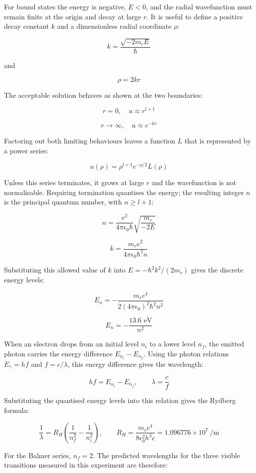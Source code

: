 \documentclass[12pt,a4paper]{article}
\begin{document}
For bound states the energy is negative, $E<0$, and the radial
wavefunction must remain finite at the origin and decay at large
$r$. It is useful to define a positive decay constant $k$ and
a dimensionless radial coordinate $\rho$:

\[
    k = \frac{\sqrt{-2m_r E}}{\hbar}
\]

and

\[
    \rho = 2 k r
\]

The acceptable solution behaves as shown at the two boundaries:

\[
    r = 0,\quad u \approx r^{l+1}
\]

\[
    r \to \infty, \quad u \approx e^{-k r}
\]

Factoring out both limiting behaviours leaves a function $L$
that is represented by a power series:

\[
    u(\rho) = \rho^{l+1} e^{-\rho/2} L(\rho)
\]

Unless this series terminates, it grows at large $r$ and the
wavefunction is not normalisable. Requiring termination
quantises the energy; the resulting integer $n$ is the principal
quantum number, with $n\geq l+1$:

\[
    n = \frac{e^2}{4 \pi \epsilon_0 \hbar}
    \sqrt{\frac{m_r}{-2E}}
\]

\[
    k = \frac{m_r e^2}{4 \pi \epsilon_0 \hbar^2 n}
\]

Substituting this allowed value of $k$ into $E=-\hbar^2 k^2/(2m_r)$
gives the discrete energy levels:

\[
    E_n = -\frac{m_r e^4}{2 (4 \pi \epsilon_0)^2 \hbar^2 n^2}
\]

\[
    E_n = -\frac{13.6 \text{ eV}}{n^2}
\]

When an electron drops from an initial level $n_i$ to a lower
level $n_f$, the emitted photon carries the energy difference
$E_{n_i}-E_{n_f}$. Using the photon relations $E_\gamma=hf$
and $f=c/\lambda$, this energy difference gives the wavelength:

\[
    hf = E_{n_i}-E_{n_f},
    \qquad
    \lambda = \frac{c}{f}
\]

Substituting the quantised energy levels into this relation
gives the Rydberg formula:

\[
    \frac{1}{\lambda}
    = R_H \left( \frac{1}{n_f^2} - \frac{1}{n_i^2} \right),
    \qquad
    R_H = \frac{m_r e^4}{8\epsilon_0^2 h^3 c}
    = 1.096776\times10^7\ \si{\per\metre}
\]

For the Balmer series, $n_f=2$. The predicted wavelengths for
the three visible transitions measured in this experiment are
therefore:
\end{document}
